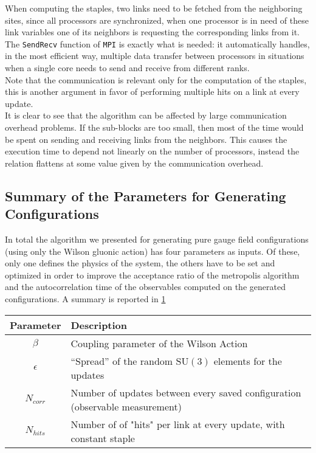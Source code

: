  

When computing the staples, two links need to be fetched from the neighboring sites, since all processors are synchronized, when one processor is in need of these link variables one of its neighbors is requesting the corresponding links from it. The \texttt{SendRecv} function of \texttt{MPI} is exactly what is needed: it automatically handles, in the most efficient way, multiple data transfer between processors in situations when a single core needs to send and receive from different ranks. \\ 
Note that the communication is relevant only for the computation of the staples, this is another argument in favor of performing multiple hits on a link at every update. \\
It is clear to see that the algorithm can be affected by large communication overhead problems. If the sub-blocks are too small, then most of the time would be spent on sending and receiving links from the neighbors. This causes the execution time to depend not linearly on the number of processors, instead the relation flattens at some value given by the communication overhead.

\subsection{Summary of the Parameters for Generating Configurations}
In total the algorithm we presented for generating pure gauge field configurations (using only the Wilson gluonic action) has four parameters as inputs. Of these, only one defines the physics of the system, the others have to be set and optimized in order to improve the acceptance ratio of the metropolis algorithm and the autocorrelation time of the observables computed on the generated configurations. A summary is reported in \cref{MC:params}
 
\begin{table}[!htb]
    \begin{center}
\begin{tabular}{cl}
    Parameter & Description\\\hline
    $\beta$ & Coupling parameter of the Wilson Action\\
    $\epsilon$ & ``Spread'' of the random $\mathrm{SU}(3)$ elements for the updates\\
    $N_{corr}$ & Number of updates between every saved configuration (observable measurement)\\
    $N_{hits}$ & Number of of "hits" per link at every update, with constant staple 
\end{tabular}
\label{MC:params}
\end{center}
\end{table}
 
